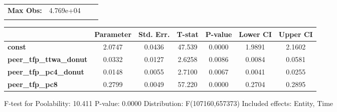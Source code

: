 \begin{center}
\begin{tabular}{lclc}
\textbf{Max Obs:}               &     4.769e+04      & \textbf{                     }   &                  \\
\textbf{}                       &                    & \textbf{                     }   &                  \\
\bottomrule
\end{tabular}
\begin{tabular}{lcccccc}
                                & \textbf{Parameter} & \textbf{Std. Err.} & \textbf{T-stat} & \textbf{P-value} & \textbf{Lower CI} & \textbf{Upper CI}  \\
\midrule
\textbf{const}                  &       2.0747       &       0.0436       &      47.539     &      0.0000      &       1.9891      &       2.1602       \\
\textbf{peer\_tfp\_ttwa\_donut} &       0.0332       &       0.0127       &      2.6258     &      0.0086      &       0.0084      &       0.0581       \\
\textbf{peer\_tfp\_pc4\_donut}  &       0.0148       &       0.0055       &      2.7100     &      0.0067      &       0.0041      &       0.0255       \\
\textbf{peer\_tfp\_pc8}         &       0.2799       &       0.0049       &      57.220     &      0.0000      &       0.2704      &       0.2895       \\
\bottomrule
\end{tabular}
\end{center}

F-test for Poolability: 10.411 \newline
 P-value: 0.0000 \newline
 Distribution: F(107160,657373) \newline
  \newline
 Included effects: Entity, Time

